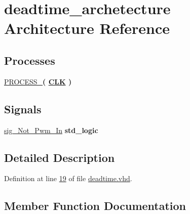 \hypertarget{classdeadtime_1_1deadtime__archetecture}{}\section{deadtime\+\_\+archetecture Architecture Reference}
\label{classdeadtime_1_1deadtime__archetecture}
\subsection*{Processes}
 \begin{DoxyCompactItemize}
\item 
\hyperlink{classdeadtime_1_1deadtime__archetecture_a19bf994b19eb6e55c6c247a7e25d7534}{P\+R\+O\+C\+E\+S\+S\+\_}{\bfseries  ( {\bfseries {\bfseries \hyperlink{classdeadtime_ab5d0ea9e968d49d94da9db07a979d402}{C\+L\+K}} \textcolor{vhdlchar}{ }} )}
\end{DoxyCompactItemize}
\subsection*{Signals}
 \begin{DoxyCompactItemize}
\item 
\hyperlink{classdeadtime_1_1deadtime__archetecture_a90c7671dbb1af7d80f90cd96262cda3b}{sig\+\_\+\+Not\+\_\+\+Pwm\+\_\+\+In} {\bfseries \textcolor{comment}{std\+\_\+logic}\textcolor{vhdlchar}{ }} 
\end{DoxyCompactItemize}


\subsection{Detailed Description}


Definition at line \hyperlink{deadtime_8vhd_source_l00019}{19} of file \hyperlink{deadtime_8vhd_source}{deadtime.\+vhd}.



\subsection{Member Function Documentation}
\hypertarget{classdeadtime_1_1deadtime__archetecture_a19bf994b19eb6e55c6c247a7e25d7534}{}
